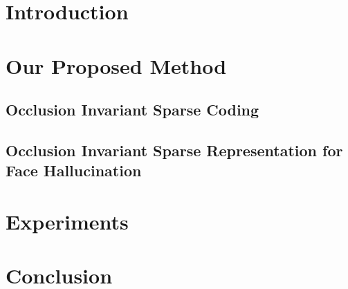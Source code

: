 \documentclass{article}
\begin{document}
\section{Introduction}


\section{Our Proposed Method}
%

\subsection{Occlusion Invariant Sparse Coding}
\label{subsec:aRSC}


\subsection{Occlusion Invariant Sparse Representation for Face Hallucination}
\label{subsec:hallucination}



\section{Experiments}
\label{sec:exp}


\section{Conclusion}
\label{sec:conclusion}



\end{document}
